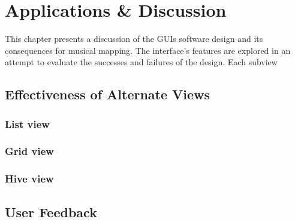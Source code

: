 \chapter{Applications \& Discussion}

This chapter presents a discussion of the GUIs software design and its consequences for musical mapping. The interface's features are explored in an attempt to evaluate the successes and failures of the design. Each subview 

\section{Effectiveness of Alternate Views} %
\label{sec:effectiveness_of_alternate_views}

	\subsection{List view} %
	\label{sub:list_view}

	

	\subsection{Grid view} %
	\label{sub:grid_view}
	

	\subsection{Hive view} %
	\label{sub:hive_view}
	


\section{User Feedback} %
\label{sec:user_feedback}

